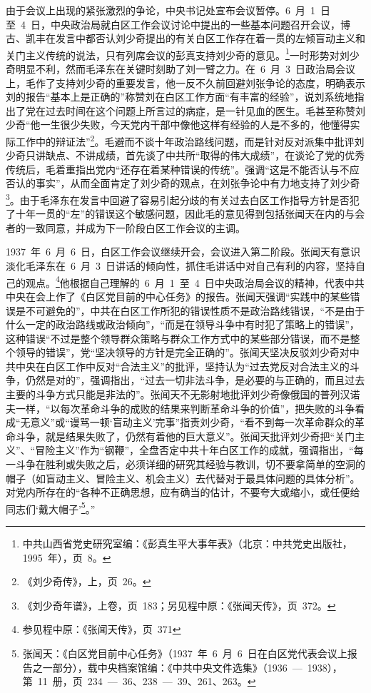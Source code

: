 由于会议上出现的紧张激烈的争论，中央书记处宣布会议暂停。6~月~1~日至~4~日，中央政治局就白区工作会议讨论中提出的一些基本问题召开会议，博古、凯丰在发言中都否认刘少奇提出的有关白区工作存在着一贯的左倾盲动主义和关门主义传统的说法，只有列席会议的彭真支持刘少奇的意见。\footnote{中共山西省党史研究室编：《彭真生平大事年表》（北京：中共党史出版社，1995~年），页~8。}一时形势对刘少奇明显不利，然而毛泽东在关键时刻助了刘一臂之力。在~6~月~3~日政治局会议上，毛作了支持刘少奇的重要发言，他一反不久前回避刘张争论的态度，明确表示刘的报告“基本上是正确的”称赞刘在白区工作方面“有丰富的经验”，说刘系统地指出了党在过去时间在这个问题上所言过的病症，是一针见血的医生。毛甚至称赞刘少奇“他一生很少失败，今天党内干部中像他这样有经验的人是不多的，他懂得实际工作中的辩证法”\footnote{《刘少奇传》，上，页~26。}。毛避而不谈十年政治路线问题，而是针对反对派集中批评刘少奇只讲缺点、不讲成绩，首先谈了中共所“取得的伟大成绩”，在谈论了党的优秀传统后，毛着重指出党内“还存在着某种错误的传统”。强调“这是不能否认与不应否认的事实”，从而全面肯定了刘少奇的观点，在刘张争论中有力地支持了刘少奇\footnote{《刘少奇年谱》，上卷，页~183；另见程中原：《张闻天传》，页~372。}。由于毛泽东在发言中回避了容易引起分歧的有关过去白区工作指导方针是否犯了十年一贯的“左”的错误这个敏感问题，因此毛的意见得到包括张闻天在内的与会者的一致同意，并成为下一阶段白区工作会议的主调。

1937~年~6~月~6~日，白区工作会议继续开会，会议进入第二阶段。张闻天有意识淡化毛泽东在~6~月~3~日讲话的倾向性，抓住毛讲话中对自己有利的内容，坚持自己的观点。\footnote{参见程中原：《张闻天传》，页~371}他根据自己理解的~6~月~1~至~4~日中央政治局会议的精神，代表中共中央在会上作了《白区党目前的中心任务》的报告。张闻天强调“实践中的某些错误是不可避免的”，中共在白区工作所犯的错误性质不是政治路线错误，“不是由于什么一定的政治路线或政治倾向”，“而是在领导斗争中有时犯了策略上的错误”，这种错误“不过是整个领导群众策略与群众工作方式中的某些部分错误，而不是整个领导的错误”，党“坚决领导的方针是完全正确的”。张闻天坚决反驳刘少奇对中共中央在白区工作中反对“合法主义”的批评，坚持认为“过去党反对合法主义的斗争，仍然是对的”，强调指出，“过去一切非法斗争，是必要的与正确的，而且过去主要的斗争方式只能是非法的”。张闻天不无影射地批评刘少奇像俄国的普列汉诺夫一样，“以每次革命斗争的成败的结果来判断革命斗争的价值”，把失败的斗争看成“无意义”或“谩骂一顿‘盲动主义’完事”指责刘少奇，“看不到每一次革命群众的革命斗争，就是结果失败了，仍然有着他的巨大意义”。张闻天批评刘少奇把“关门主义”、“冒险主义”作为“钢鞭”，全盘否定中共十年白区工作的成就，强调指出，“每一斗争在胜利或失败之后，必须详细的研究其经验与教训，切不要拿简单的空洞的帽子（如盲动主义、冒险主义、机会主义）去代替对于最具体问题的具体分析”。对党内所存在的“各种不正确思想，应有确当的估计，不要夸大或缩小，或任便给同志们‘戴大帽子’\footnote{张闻天：《白区党目前中心任务》（1937~年~6~月~6~日在白区党代表会议上报告之一部分），载中央档案馆编：《中共中央文件选集》（1936~—~1938），第~11~册，页~234~—~36、238~—~39、261、263。}。”

